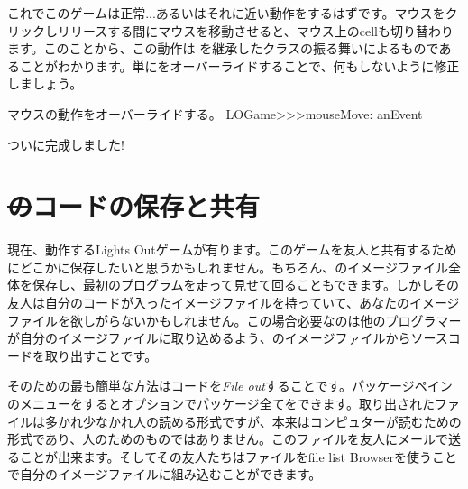 \documentclass[a4paper,10pt,twoside]{book}
\begin{document}


これでこのゲームは正常...あるいはそれに近い動作をするはずです。マウスをクリックしリリースする間にマウスを移動させると、マウス上のcellも切り替わります。このことから、この動作は  を継承したクラスの振る舞いによるものであることがわかります。単にをオーバーライドすることで、何もしないように修正しましょう。

\begin{method}[mouseMove:]{マウスの動作をオーバーライドする。}
LOGame>>>mouseMove: anEvent
\end{method}

ついに完成しました!


\section{\st のコードの保存と共有}

現在、動作するLights Outゲームが有ります。このゲームを友人と共有するためにどこかに保存したいと思うかもしれません。もちろん、\pharo のイメージファイル全体を保存し、最初のプログラムを走って見せて回ることもできます。しかしその友人は自分のコードが入ったイメージファイルを持っていて、あなたのイメージファイルを欲しがらないかもしれません。この場合必要なのは他のプログラマーが自分のイメージファイルに取り込めるよう、\pharo のイメージファイルからソースコードを取り出すことです。

そのための最も簡単な方法はコードを\emph{File out}することです。パッケージペインのメニューを\actclick するとオプションでパッケージ全てをできます。取り出されたファイルは多かれ少なかれ人の読める形式ですが、本来はコンピュターが読むための形式であり、人のためのものではありません。このファイルを友人にメールで送ることが出来ます。そしてその友人たちはファイルをfile list Browserを使うことで自分の\pharo イメージファイルに組み込むことができます。
\end{document}
